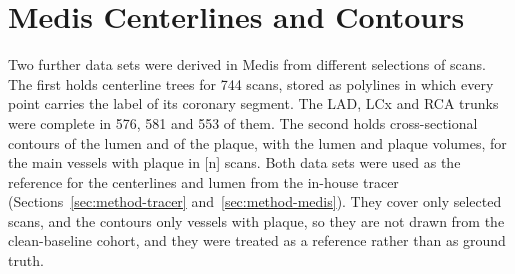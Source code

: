 \section{Medis Centerlines and Contours}
\label{sec:data-medis}

Two further data sets were derived in Medis from different selections of scans.
The first holds centerline trees for 744 scans, stored as polylines in which every point carries the label of its coronary segment.
The LAD, LCx and RCA trunks were complete in 576, 581 and 553 of them.
The second holds cross-sectional contours of the lumen and of the plaque, with the lumen and plaque volumes, for the main vessels with plaque in [n] scans.
Both data sets were used as the reference for the centerlines and lumen from the in-house tracer (Sections~\ref{sec:method-tracer} and~\ref{sec:method-medis}).
They cover only selected scans, and the contours only vessels with plaque, so they are not drawn from the clean-baseline cohort, and they were treated as a reference rather than as ground truth.
